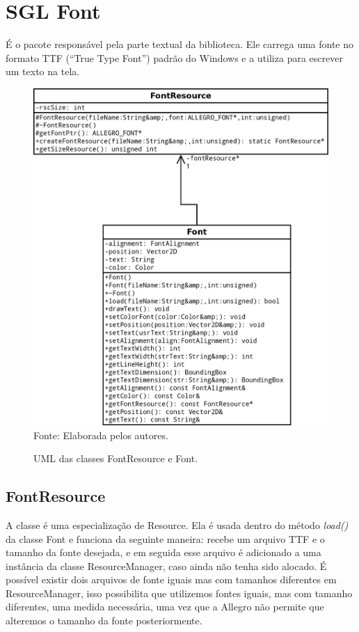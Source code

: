 \section{SGL Font}
%
%
É o pacote responsável pela parte textual da biblioteca. Ele carrega uma fonte no formato TTF (``True Type Font'') padrão do Windows e a utiliza para escrever um texto na tela.
%
%
%
\begin{figure}[H]
    \centering
    \caption{UML das classes FontResource e Font.}
    \label{Font}
    \includegraphics[scale = 0.20]{uml/Font.png}
    \\Fonte: Elaborada pelos autores.
\end{figure}
%
%
\subsection{FontResource}
%
%
A classe é uma especialização de Resource. Ela é usada dentro do método \textit{load()} da classe Font e funciona da seguinte maneira: recebe um arquivo TTF e o tamanho da fonte desejada, e em seguida esse arquivo é adicionado a uma instância da classe ResourceManager, caso ainda não tenha sido alocado. É possível existir dois arquivos de fonte iguais mas com tamanhos diferentes em ResourceManager, isso possibilita que utilizemos fontes iguais, mas com tamanho diferentes, uma medida necessária, uma vez que a Allegro não permite que alteremos o tamanho da fonte posteriormente.
%
%
